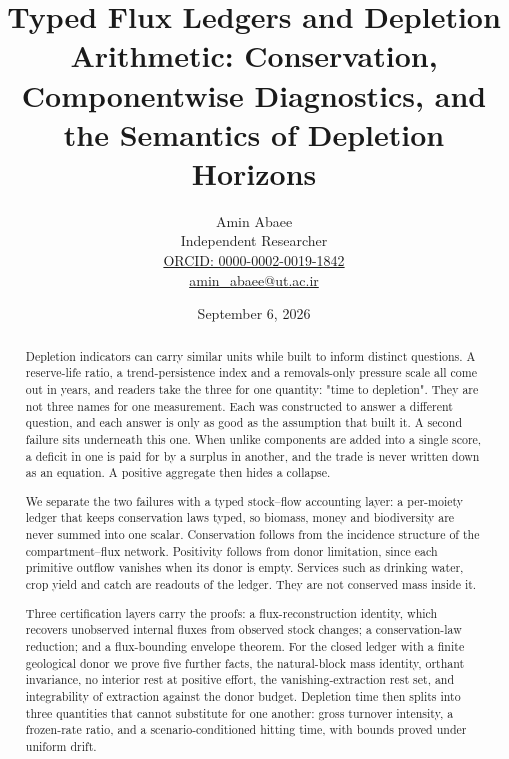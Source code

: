 \documentclass[11pt]{article}
\begin{document}
\title{Typed Flux Ledgers and Depletion Arithmetic: Conservation, Componentwise Diagnostics, and the Semantics of Depletion Horizons} \author{Amin Abaee\\[0.35em]
{\small Independent Researcher}\\[0.55em]
{\small\href{https://orcid.org/\allowbreak{}0000-0002-0019-1842}{ORCID: 0000-0002-0019-1842}}\\[0.3em]
{\small\href{mailto:amin\_abaee@ut.ac.ir}{amin\_abaee@ut.ac.ir}}}
\date{September 6, 2026}
\maketitle

\begin{abstract}


Depletion indicators can carry similar units while built to inform distinct questions. A reserve-life ratio, a trend-persistence index and a removals-only pressure scale all come out in years, and readers take the three for one quantity: "time to depletion". They are not three names for one measurement. Each was constructed to answer a different question, and each answer is only as good as the assumption that built it. A second failure sits underneath this one. When unlike components are added into a single score, a deficit in one is paid for by a surplus in another, and the trade is never written down as an equation. A positive aggregate then hides a collapse.

We separate the two failures with a typed stock--flow accounting layer: a per-moiety ledger that keeps conservation laws typed, so biomass, money and biodiversity are never summed into one scalar. Conservation follows from the incidence structure of the compartment--flux network. Positivity follows from donor limitation, since each primitive outflow vanishes when its donor is empty. Services such as drinking water, crop yield and catch are readouts of the ledger. They are not conserved mass inside it.

Three certification layers carry the proofs: a flux-reconstruction identity, which recovers unobserved internal fluxes from observed stock changes; a conservation-law reduction; and a flux-bounding envelope theorem. For the closed ledger with a finite geological donor we prove five further facts, the natural-block mass identity, orthant invariance, no interior rest at positive effort, the vanishing-extraction rest set, and integrability of extraction against the donor budget. Depletion time then splits into three quantities that cannot substitute for one another: gross turnover intensity, a frozen-rate ratio, and a scenario-conditioned hitting time, with bounds proved under uniform drift.


\end{abstract}
\end{document}
